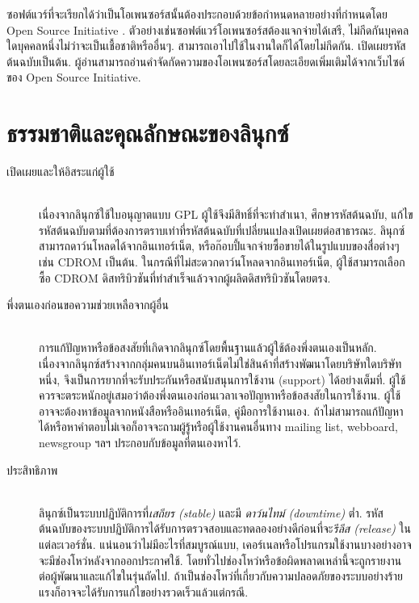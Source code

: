 \begin{thwbr}
{ซอฟต์แวร์ที่จะเรียกได้ว่าเป็นโอเพนซอร์สนั้นต้องประกอบด้วยข้อกำหนดหลายอย่างที่กำหนดโดย Open Source Initiative \cite{osi}.%
 ตัวอย่างเช่นซอฟต์แวร์โอเพนซอร์สต้องแจกจ่ายได้เสรี, ไม่กีดกันบุคคลใดบุคคลหนึ่งไม่ว่าจะเป็นเชื้อชาติหรืออื่นๆ. สามารถเอาไปใช้ในงานใดก็ได้โดยไม่กีดกัน. เปิดเผยรหัสต้นฉบับเป็นต้น. ผู้อ่านสามารถอ่านคำจัดกัดความของโอเพนซอร์สโดยละเอียดเพิ่มเติมได้จากเว็บไซด์ของ Open Source Initiative.


\section{ธรรมชาติและคุณลักษณะของลินุกซ์}

\begin{description}
\item[เปิดเผยและให้อิสระแก่ผู้ใช้]\mbox{}\\
เนื่องจากลินุกซ์ใช้ใบอนุญาตแบบ GPL ผู้ใช้จึงมีสิทธิ์ที่จะทำสำเนา, ศึกษารหัสต้นฉบับ, แก้ไขรหัสต้นฉบับตามที่ต้องการตราบเท่าที่รหัสต้นฉบับที่เปลี่ยนแปลงเปิดเผยต่อสาธารณะ. ลินุกซ์สามารถดาว์นโหลดได้จากอินเทอร์เน็ต, หรือก๊อบปี้แจกจ่ายซื้อขายได้ในรูปแบบของสื่อต่างๆเช่น CDROM เป็นต้น. ในกรณีที่ไม่สะดวกดาว์นโหลดจากอินเทอร์เน็ต, ผู้ใช้สามารถเลือกซื้อ CDROM ดิสทริบิวชันที่ทำสำเร็จแล้วจากผู้ผลิตดิสทริบิวชันโดยตรง.


\item[พึ่งตนเองก่อนขอความช่วยเหลือจากผู้อื่น]\mbox{}\\
การแก้ปัญหาหรือข้อสงสัยที่เกิดจากลินุกซ์โดยพื้นฐานแล้วผู้ใช้ต้องพึ่งตนเองเป็นหลัก. เนื่องจากลินุกซ์สร้างจากกลุ่มคนบนอินเทอร์เน็ตไม่ใช่สินค้าที่สร้างพัฒนาโดยบริษัทใดบริษัทหนึ่ง, จึงเป็นการยากที่จะรับประกันหรือสนับสนุนการใช้งาน (support) ได้อย่างเต็มที่. ผู้ใช้ควรจะตระหนักอยู่เสมอว่าต้องพึ่งตนเองก่อนเวลาเจอปัญหาหรือข้อสงสัยในการใช้งาน. ผู้ใช้อาจจะต้องหาข้อมูลจากหนังสือหรืออินเทอร์เน็ต, คู่มือการใช้งานเอง. ถ้าไม่สามารถแก้ปัญหาได้หรือหาคำตอบไม่เจอก็อาจจะถามผู้รู้หรือผู้ใช้งานคนอื่นทาง mailing list, webboard, newsgroup ฯลฯ ประกอบกับข้อมูลที่ตนเองหาไว้. 

\item[ประสิทธิภาพ]\mbox{}\\
ลินุกซ์เป็นระบบปฏิบัติการที่{\em เสถียร (stable)} และมี {\em ดาว์นไทม์ (downtime)} ต่ำ. รหัสต้นฉบับของระบบปฏิบัติการได้รับการตรวจสอบและทดลองอย่างดีก่อนที่จะ{\em รีลีส (release)} ในแต่ละเวอร์ชั่น. แน่นอนว่าไม่มีอะไรที่สมบูรณ์แบบ, เคอร์เนลหรือโปรแกรมใช้งานบางอย่างอาจจะมีช่องโหว่หลังจากออกประกาศใช้. โดยทั่วไปช่องโหว่หรือข้อผิดพลาดเหล่านี้จะถูกรายงานต่อผู้พัฒนาและแก้ไขในรุ่นถัดไป. ถ้าเป็นช่องโหว่ที่เกี่ยวกับความปลอดภัยของระบบอย่างร้ายแรงก็อาจจะได้รับการแก้ไขอย่างรวดเร็วแล้วแต่กรณี.


\end{description}}
\end{thwbr}

